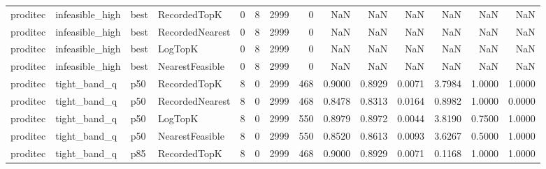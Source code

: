 \begin{tabular}{llllrrrrrrrrrr}
proditec &      infeasible\_high &   best &    RecordedTopK &           0 &          8 &           2999 &                   0 &            NaN &             NaN &                       NaN &            NaN &                    NaN &                     NaN \\
proditec &      infeasible\_high &   best & RecordedNearest &           0 &          8 &           2999 &                   0 &            NaN &             NaN &                       NaN &            NaN &                    NaN &                     NaN \\
proditec &      infeasible\_high &   best &         LogTopK &           0 &          8 &           2999 &                   0 &            NaN &             NaN &                       NaN &            NaN &                    NaN &                     NaN \\
proditec &      infeasible\_high &   best & NearestFeasible &           0 &          8 &           2999 &                   0 &            NaN &             NaN &                       NaN &            NaN &                    NaN &                     NaN \\
proditec &         tight\_band\_q &    p50 &    RecordedTopK &           8 &          0 &           2999 &                 468 &         0.9000 &          0.8929 &                    0.0071 &         3.7984 &                 1.0000 &                  1.0000 \\
proditec &         tight\_band\_q &    p50 & RecordedNearest &           8 &          0 &           2999 &                 468 &         0.8478 &          0.8313 &                    0.0164 &         0.8982 &                 1.0000 &                  0.0000 \\
proditec &         tight\_band\_q &    p50 &         LogTopK &           8 &          0 &           2999 &                 550 &         0.8979 &          0.8972 &                    0.0044 &         3.8190 &                 0.7500 &                  1.0000 \\
proditec &         tight\_band\_q &    p50 & NearestFeasible &           8 &          0 &           2999 &                 550 &         0.8520 &          0.8613 &                    0.0093 &         3.6267 &                 0.5000 &                  1.0000 \\
proditec &         tight\_band\_q &    p85 &    RecordedTopK &           8 &          0 &           2999 &                 468 &         0.9000 &          0.8929 &                    0.0071 &         0.1168 &                 1.0000 &                  1.0000 \\

\end{tabular}
